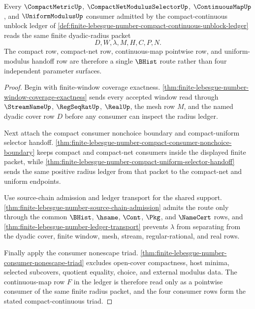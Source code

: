 \begin{theorem}
\label{thm:finite-lebesgue-number-compact-continuous-triad}
Every $\CompactMetricUp$, $\CompactNetModulusSelectorUp$, $\ContinuousMapUp$, and $\UniformModulusUp$ consumer admitted by the compact-continuous unblock ledger of \autoref{def:finite-lebesgue-number-compact-continuous-unblock-ledger} reads the same finite dyadic-radius packet
$$
D,W,\lambda,M,H,C,P,N .
$$
The compact row, compact-net row, continuous-map pointwise row, and uniform-modulus handoff row are therefore a single $\BHist$ route rather than four independent parameter surfaces.
\end{theorem}
\begin{proof}
Begin with finite-window coverage exactness. \autoref{thm:finite-lebesgue-number-window-coverage-exactness} sends every accepted window read through $\StreamNameUp$, $\RegSeqRatUp$, $\RealUp$, the mesh row $M$, and the named dyadic cover row $D$ before any consumer can inspect the radius ledger.

Next attach the compact consumer nonchoice boundary and compact-uniform selector handoff. \autoref{thm:finite-lebesgue-number-compact-consumer-nonchoice-boundary} keeps compact and compact-net consumers inside the displayed finite packet, while \autoref{thm:finite-lebesgue-number-compact-uniform-selector-handoff} sends the same positive radius ledger from that packet to the compact-net and uniform endpoints.

Use source-chain admission and ledger transport for the shared support. \autoref{thm:finite-lebesgue-number-source-chain-admission} admits the route only through the common $\BHist$, $\hsame$, $\Cont$, $\Pkg$, and $\NameCert$ rows, and \autoref{thm:finite-lebesgue-number-ledger-transport} prevents $\lambda$ from separating from the dyadic cover, finite window, mesh, stream, regular-rational, and real rows.

Finally apply the consumer nonescape triad. \autoref{thm:finite-lebesgue-number-consumer-nonescape-triad} excludes open-cover compactness, host minima, selected subcovers, quotient equality, choice, and external modulus data. The continuous-map row $F$ in the ledger is therefore read only as a pointwise consumer of the same finite radius packet, and the four consumer rows form the stated compact-continuous triad.
\end{proof}

